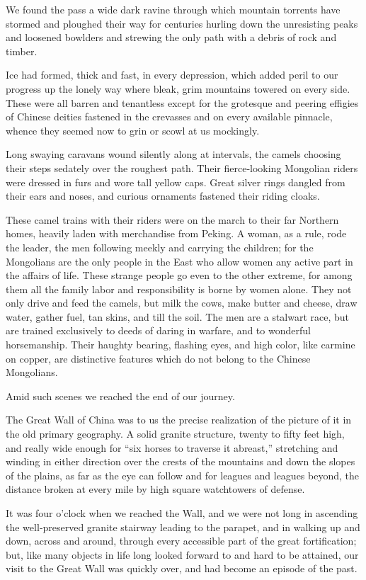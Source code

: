 \documentclass[12pt]{book}
\begin{document}
We found the pass a wide dark ravine through which mountain torrents have
stormed and ploughed their way for centuries hurling down the unresisting peaks
and loosened bowlders and strewing the only path with a debris of rock and
timber.

Ice had formed, thick and fast, in every depression, which added peril to our
progress up the lonely way where bleak, grim mountains towered on every side.
These were all barren and tenantless except for the grotesque and peering effigies
of Chinese deities fastened in the crevasses and on every available pinnacle,
whence they seemed now to grin or scowl at us mockingly.

Long swaying caravans wound silently along at intervals, the camels choosing
their steps sedately over the roughest path. Their fierce‐looking Mongolian riders
were dressed in furs and wore tall yellow caps. Great silver rings dangled from
their ears and noses, and curious ornaments fastened their riding cloaks.

These camel trains with their riders were on the march to their far Northern
homes, heavily laden with merchandise from Peking. A woman, as a rule, rode the
leader, the men following meekly and carrying the children; for the Mongolians
are the only people in the East who allow women any active part in the affairs
of life. These strange people go even to the other extreme, for among them all
the family labor and responsibility is borne by women alone. They not only
drive and feed the camels, but milk the cows, make butter and cheese, draw
water, gather fuel, tan skins, and till the soil. The men are a stalwart race, but are
trained exclusively to deeds of daring in warfare, and to wonderful horsemanship.
Their haughty bearing, flashing eyes, and high color, like carmine on copper, are
distinctive features which do not belong to the Chinese Mongolians.

Amid such scenes we reached the end of our journey.

The Great Wall of China was to us the precise realization of the picture of
it in the old primary geography. A solid granite structure, twenty to fifty feet
high, and really wide enough for “six horses to traverse it abreast,” stretching and
winding in either direction over the crests of the mountains and down the slopes
of the plains, as far as the eye can follow and for leagues and leagues beyond, the
distance broken at every mile by high square watchtowers of defense.

It was four o’clock when we reached the Wall, and we were not long in
ascending the well‐preserved granite stairway leading to the parapet, and in
walking up and down, across and around, through every accessible part of the
great fortification; but, like many objects in life long looked forward to and hard
to be attained, our visit to the Great Wall was quickly over, and had become an
episode of the past.
\end{document}
